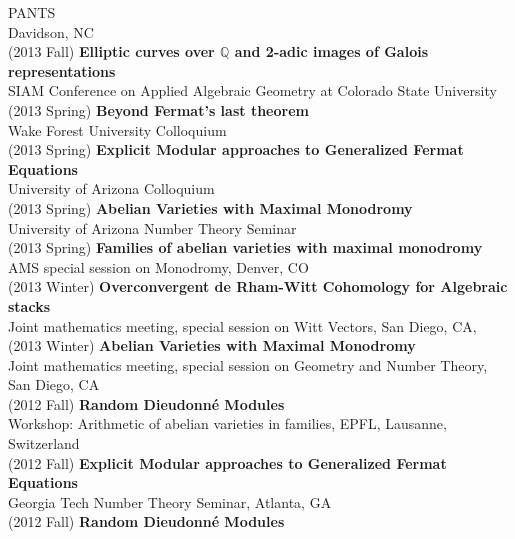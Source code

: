 \documentclass[margin,line]{res}
\begin{document}
\begin{resume}
PANTS\\ Davidson, NC
\vspace{.05cm}\\
(2013 Fall) \textbf{Elliptic curves over $\mathbb{Q}$ and 2-adic images of Galois representations}\\  
SIAM Conference on Applied Algebraic Geometry at Colorado State University 
\vspace{.05cm}\\
(2013 Spring) \textbf{Beyond Fermat's last theorem}\\
Wake Forest University Colloquium
\vspace{.05cm}\\
(2013 Spring) \textbf{Explicit Modular approaches to Generalized Fermat Equations}\\
University of Arizona Colloquium
\vspace{.05cm}\\
(2013 Spring) \textbf{Abelian Varieties with Maximal Monodromy}\\
University of Arizona Number Theory Seminar 
\vspace{.05cm}\\
(2013 Spring) \textbf{Families of abelian varieties with maximal monodromy}\\
AMS special session on Monodromy, 
Denver, CO
\vspace{.05cm}\\
(2013 Winter) \textbf{Overconvergent de Rham-Witt Cohomology for Algebraic stacks}\\
Joint mathematics meeting, special session on Witt Vectors, San Diego, CA, 
\vspace{.05cm}\\
(2013 Winter) \textbf{Abelian Varieties with Maximal Monodromy}\\
Joint mathematics meeting, special session on Geometry and Number Theory, San Diego, CA
\vspace{.05cm}\\
(2012 Fall) \textbf{Random Dieudonn\'e Modules}\\
Workshop: Arithmetic of abelian varieties in families, EPFL, Lausanne, Switzerland 
\vspace{.05cm}\\
(2012 Fall) \textbf{Explicit Modular approaches to Generalized Fermat Equations}\\
Georgia Tech Number Theory Seminar, Atlanta, GA 
\vspace{.05cm}\\
(2012 Fall) \textbf{Random Dieudonn\'e Modules}\\

\end{resume}
\end{document}
